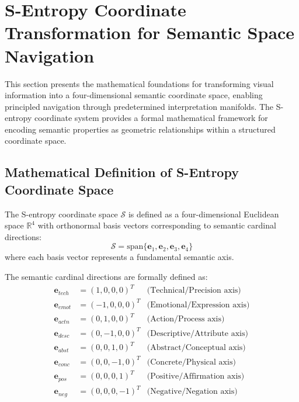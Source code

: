 \section{S-Entropy Coordinate Transformation for Semantic Space Navigation}
\label{sec:s-entropy-coordinates}

This section presents the mathematical foundations for transforming visual information into a four-dimensional semantic coordinate space, enabling principled navigation through predetermined interpretation manifolds. The S-entropy coordinate system provides a formal mathematical framework for encoding semantic properties as geometric relationships within a structured coordinate space.

\subsection{Mathematical Definition of S-Entropy Coordinate Space}

\begin{definition}
The S-entropy coordinate space $\mathcal{S}$ is defined as a four-dimensional Euclidean space $\mathbb{R}^4$ with orthonormal basis vectors corresponding to semantic cardinal directions:
\begin{equation}
\mathcal{S} = \text{span}\{\mathbf{e}_1, \mathbf{e}_2, \mathbf{e}_3, \mathbf{e}_4\}
\label{eq:s-entropy-space}
\end{equation}
where each basis vector represents a fundamental semantic axis.
\end{definition}

The semantic cardinal directions are formally defined as:
\begin{align}
\mathbf{e}_{tech} &= (1, 0, 0, 0)^T & \text{(Technical/Precision axis)} \label{eq:tech-axis} \\
\mathbf{e}_{emot} &= (-1, 0, 0, 0)^T & \text{(Emotional/Expression axis)} \label{eq:emot-axis} \\
\mathbf{e}_{actn} &= (0, 1, 0, 0)^T & \text{(Action/Process axis)} \label{eq:actn-axis} \\
\mathbf{e}_{desc} &= (0, -1, 0, 0)^T & \text{(Descriptive/Attribute axis)} \label{eq:desc-axis} \\
\mathbf{e}_{abst} &= (0, 0, 1, 0)^T & \text{(Abstract/Conceptual axis)} \label{eq:abst-axis} \\
\mathbf{e}_{conc} &= (0, 0, -1, 0)^T & \text{(Concrete/Physical axis)} \label{eq:conc-axis} \\
\mathbf{e}_{pos} &= (0, 0, 0, 1)^T & \text{(Positive/Affirmation axis)} \label{eq:pos-axis} \\
\mathbf{e}_{neg} &= (0, 0, 0, -1)^T & \text{(Negative/Negation axis)} \label{eq:neg-axis}
\end{align}

